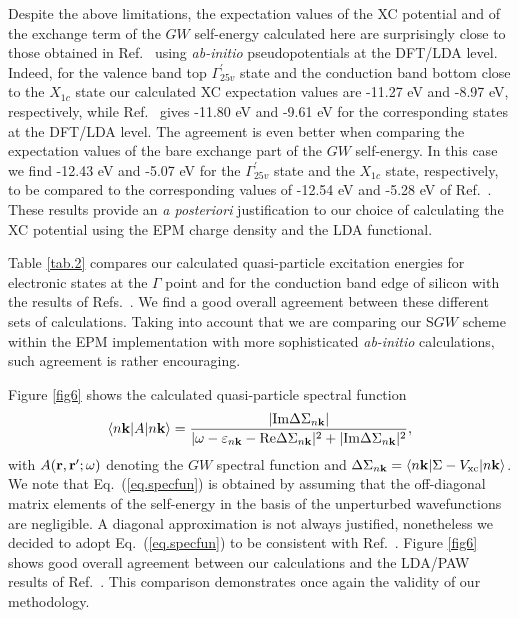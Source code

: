 \documentclass[twocolumn,prb,showpacs,superscriptaddress]{revtex4}
\def\w{\omega}
\def\E{\varepsilon}
\def\k{{\bf k}}
\def\r{{\bf r}}
\def\rp{{\bf r^\prime}}
\begin{document}
Despite the above limitations, the expectation values of the
XC potential and of the exchange term of the $GW$ self-energy calculated here are surprisingly
close to those obtained in Ref.\  using {\it ab-initio} pseudopotentials
at the DFT/LDA level. Indeed, for the valence band top 
$\Gamma_{25v}^\prime$ state and the conduction band bottom close to the $X_{1c}$ state
our calculated XC expectation values are -11.27 eV and -8.97 eV, respectively,
while Ref.\  gives -11.80 eV and -9.61 eV for the corresponding states
at the DFT/LDA level. The agreement is even better when comparing the expectation values
of the bare exchange part of the $GW$ self-energy. In this case we find -12.43 eV and -5.07 eV
for the $\Gamma_{25v}^\prime$ state and the $X_{1c}$ state, respectively, to be compared
to the corresponding values of -12.54 eV and -5.28 eV of Ref.~.
These results provide an {\it a posteriori} justification to our choice of calculating
the XC potential using the EPM charge density and the LDA functional.

Table \ref{tab.2} compares our
calculated quasi-particle excitation energies for electronic states at the $\Gamma$ 
point and for the conduction band edge of silicon with the results of Refs.\ .
We find a good overall agreement between these different sets of calculations.
Taking into account that we are comparing our S$GW$ scheme
within the EPM implementation with more sophisticated {\it ab-initio} calculations,
such agreement is rather encouraging.

Figure \ref{fig6} shows the calculated quasi-particle spectral function 
  \begin{equation}\label{eq.specfun}
  \langle n\k| A|n\k\rangle = \frac{|{\rm Im} \Delta\Sigma_{n\k}|}
  {| \w-\E_{n\k} - {\rm Re}  \Delta\Sigma_{n\k} |^2 + | {\rm Im}  \Delta\Sigma_{n\k} |^2},
  \end{equation}
with $A(\r,\rp;\w)$ denoting the $GW$ spectral function and $\Delta \Sigma_{n\k} = \langle n\k| \Sigma - V_{\rm xc} |n\k\rangle$.
We note that Eq.\ (\ref{eq.specfun}) is obtained by assuming that the off-diagonal
matrix elements of the self-energy in the basis of the unperturbed
wavefunctions are negligible. A diagonal approximation is not always justified, nonetheless
we decided to adopt Eq.\ (\ref{eq.specfun}) to be consistent with Ref.\ .
Figure \ref{fig6} shows good overall agreement between our calculations and the
LDA/PAW results of Ref.\ . This comparison demonstrates
once again the validity of our methodology.
\end{document}
